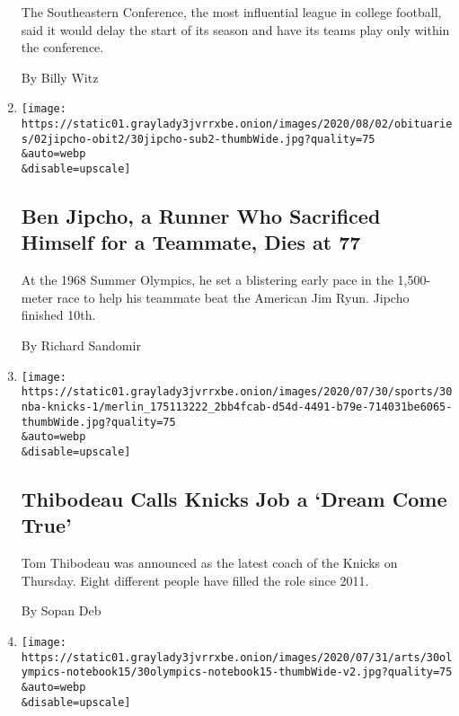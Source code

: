 \begin{enumerate}
  The Southeastern Conference, the most influential league in college
  football, said it would delay the start of its season and have its
  teams play only within the conference.

  By Billy Witz
\item
  \href{/2020/07/30/sports/olympics/ben-jipcho-dead.html}{}

  \texttt{[image: https://static01.graylady3jvrrxbe.onion/images/2020/08/02/obituaries/02jipcho-obit2/30jipcho-sub2-thumbWide.jpg?quality=75\\\&auto=webp\\\&disable=upscale]}

  \hypertarget{ben-jipcho-a-runner-who-sacrificed-himself-for-a-teammate-dies-at-77}{%
  \subsection{Ben Jipcho, a Runner Who Sacrificed Himself for a
  Teammate, Dies at
  77}\label{ben-jipcho-a-runner-who-sacrificed-himself-for-a-teammate-dies-at-77}}

  At the 1968 Summer Olympics, he set a blistering early pace in the
  1,500-meter race to help his teammate beat the American Jim Ryun.
  Jipcho finished 10th.

  By Richard Sandomir
\item
  \href{/2020/07/30/sports/basketball/nba-knicks-coach-tom-thibodeau.html}{}

  \texttt{[image: https://static01.graylady3jvrrxbe.onion/images/2020/07/30/sports/30nba-knicks-1/merlin\_175113222\_2bb4fcab-d54d-4491-b79e-714031be6065-thumbWide.jpg?quality=75\\\&auto=webp\\\&disable=upscale]}

  \hypertarget{thibodeau-calls-knicks-job-a-dream-come-true}{%
  \subsection{Thibodeau Calls Knicks Job a `Dream Come
  True'}\label{thibodeau-calls-knicks-job-a-dream-come-true}}

  Tom Thibodeau was announced as the latest coach of the Knicks on
  Thursday. Eight different people have filled the role since 2011.

  By Sopan Deb
\item
  \href{/2020/07/30/arts/design/tokyo-olympics-1964-design.html}{}

  \texttt{[image: https://static01.graylady3jvrrxbe.onion/images/2020/07/31/arts/30olympics-notebook15/30olympics-notebook15-thumbWide-v2.jpg?quality=75\\\&auto=webp\\\&disable=upscale]}


\end{enumerate}
